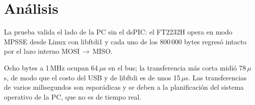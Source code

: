 \section{Análisis}

La prueba valida el lado de la PC sin el dsPIC: el FT2232H opera en modo
MPSSE desde Linux con libftdi1 y cada uno de los 800\,000 bytes regresó
intacto por el lazo interno MOSI\,$\to$\,MISO.

Ocho bytes a 1\,MHz ocupan 64\,$\mu$s en el bus; la transferencia más corta
midió 78\,$\mu$s, de modo que el costo del USB y de libftdi es de unos
15\,$\mu$s. Las transferencias de varios milisegundos son esporádicas y se
deben a la planificación del sistema operativo de la PC, que no es de tiempo
real.

